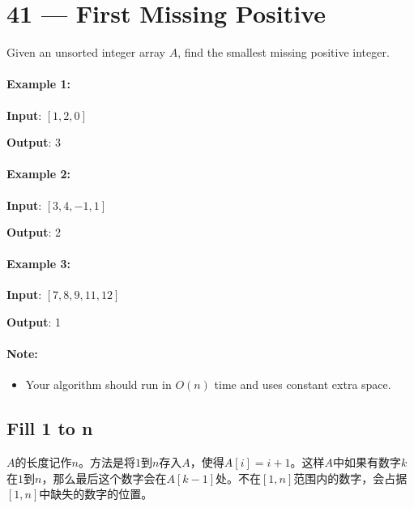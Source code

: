 \section{41 --- First Missing Positive}
Given an unsorted integer array $A$, find the smallest missing positive integer.

\paragraph{Example 1:}

\begin{flushleft}
\textbf{Input}: $[1,2,0]$

\textbf{Output}: 3

\end{flushleft}

\paragraph{Example 2:}

\begin{flushleft}
\textbf{Input}: $[3,4,-1,1]$

\textbf{Output}: 2

\end{flushleft}

\paragraph{Example 3:}

\begin{flushleft}
\textbf{Input}: $[7,8,9,11,12]$

\textbf{Output}: 1
\end{flushleft}

\paragraph{Note:}

\begin{itemize}
\item Your algorithm should run in $O(n)$ time and uses constant extra space.
\end{itemize}

\subsection{Fill 1 to n}
$A$的长度记作$n$。方法是将$1$到$n$存入$A$，使得$A[i]=i+1$。这样$A$中如果有数字$k$在$1$到$n$，那么最后这个数字会在$A[k-1]$处。不在$[1,n]$范围内的数字，会占据$[1,n]$中缺失的数字的位置。

